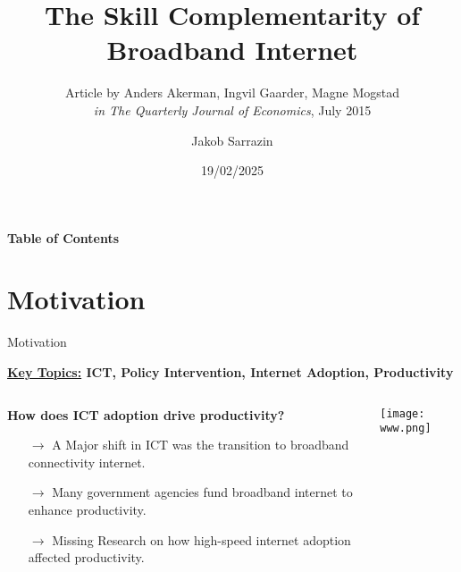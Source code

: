 \documentclass[compress, aspectratio=169, xcolor=dvipsnames]{beamer}
\author{Jakob Sarrazin}
\title[The Skill Complementarity of Broadband Internet]{The Skill Complementarity of Broadband Internet}
\subtitle{{Article by Anders Akerman, Ingvil Gaarder, Magne Mogstad \\ \textit{in The Quarterly Journal of Economics}, July 2015}}
\institute{Michelangelo Rossi \\ Digital Economics \\ ENSAE, Institut Polytechnique de Paris}
\date{19/02/2025}
\begin{document}
	
	\begin{frame}[plain]
    	\titlepage
 	\end{frame}
 	

\addtocounter{framenumber}{-2}
 	\begin{frame}
 	\large{\textbf{Table of Contents}}
		\tableofcontents[sectionstyle=show,subsectionstyle=shaded]
	\end{frame}
	
	

\section{Motivation}
\begin{frame}{Motivation}

\textbf{\underline{Key Topics:} ICT, Policy Intervention, Internet Adoption, Productivity} \newline

\begin{columns}
\begin{column}{0.68\textwidth}
	

\textbf{How does ICT adoption drive productivity?}


\begin{itemize}
	\item [$\rightarrow$] A Major shift in ICT was the transition to broadband connectivity internet.
	\item [$\rightarrow$] Many government agencies fund broadband internet to enhance productivity.
	\item [$\rightarrow$] Missing Research on how high-speed internet adoption affected productivity.
	\end{itemize}
	
\end{column}

\begin{column}{0.3\textwidth}
	\begin{center}
     \texttt{[image: www.png]}
     \end{center}
\end{column}

\end{columns}


\end{frame}
\end{document}
